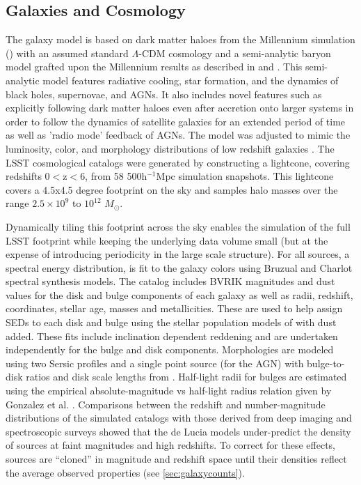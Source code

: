 \documentclass[]{article}
\begin{document}
\subsection{Galaxies and Cosmology \label{sec:gal}}

The galaxy model is based on dark matter haloes from the Millennium
simulation (\cite{millennium}) with an assumed standard $\Lambda$-CDM
cosmology and a semi-analytic baryon model grafted upon the Millennium
results as described in \cite{springel} and \cite{delucia}. This
semi-analytic model features radiative cooling, star formation, and
the dynamics of black holes, supernovae, and AGNs. It also includes
novel features such as explicitly following dark matter haloes even
after accretion onto larger systems in order to follow the dynamics of
satellite galaxies for an extended period of time as well as 'radio
mode' feedback of AGNs. The model was adjusted to mimic the
luminosity, color, and morphology distributions of low redshift
galaxies \cite{delucia}. The LSST cosmological catalogs were generated
by constructing a lightcone, covering redshifts 0$<$z$<$6, from 58
500h$^{-1}$Mpc simulation snapshots. This lightcone covers a 4.5x4.5
degree footprint on the sky and samples halo masses over the range
$2.5\times10^9$ to $10^{12}$ $M_\odot$. 

Dynamically tiling this footprint across the sky enables the
simulation of the full LSST footprint while keeping the underlying
data volume small (but at the expense of introducing periodicity in
the large scale structure).  For all sources, a spectral energy
distribution, is fit to the galaxy colors using Bruzual and Charlot
spectral synthesis models\cite{bruzual}. The
\cite{delucia} catalog includes BVRIK magnitudes and dust values for
the disk and bulge components of each galaxy as well as radii,
redshift, coordinates, stellar age, masses and metallicities. These
are used to help assign SEDs to each disk and bulge using the stellar
population models of  with dust added. These fits include
inclination dependent reddening and are undertaken independently for
the bulge and disk components. Morphologies are modeled using two
Sersic profiles and a single point source (for the AGN) with
bulge-to-disk ratios and disk scale lengths from \cite{delucia}.
 Half-light radii for bulges are estimated using the empirical
absolute-magnitude vs half-light radius relation given by Gonzalez et
al. \cite{gonzalez09}.  Comparisons between the redshift and
number-magnitude distributions of the simulated catalogs with those
derived from deep imaging and spectroscopic surveys showed that the de
Lucia models under-predict the density of sources at faint magnitudes
and high redshifts. To correct for these effects, sources are
``cloned'' in magnitude and redshift space until their densities
reflect the average observed properties (see
\ref{sec:galaxycounts}). 
\end{document}
